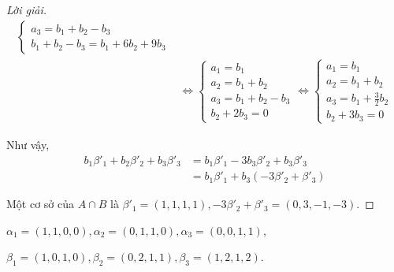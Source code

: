 \documentclass[class=linear-algebra,crop=false]{standalone}
\begin{document}
\begin{proof}[Lời giải]
\begin{align*}
\begin{cases}
            a_{3} = b_{1} + b_{2} - b_{3} \\
            b_{1} + b_{2} - b_{3} = b_{1} + 6b_{2} + 9b_{3}
        \end{cases}       \\
         & \Longleftrightarrow\begin{cases}
                                  a_{1} = b_{1}                 \\
                                  a_{2} = b_{1} + b_{2}         \\
                                  a_{3} = b_{1} + b_{2} - b_{3} \\
                                  b_{2} + 2b_{3} = 0
                              \end{cases}
        \Longleftrightarrow
        \begin{cases}
            a_{1} = b_{1}                    \\
            a_{2} = b_{1} + b_{2}            \\
            a_{3} = b_{1} + \frac{3}{2}b_{2} \\
            b_{2} + 3b_{3} = 0
        \end{cases}
    \end{align*}
    \par Như vậy,
    \begin{align*}
        b_{1}\beta'_{1} + b_{2}\beta'_{2} + b_{3}\beta'_{3}
         & = b_{1}\beta'_{1} - 3b_{3}\beta'_{2} + b_{3}\beta'_{3} \\
         & = b_{1}\beta'_{1} + b_{3}(-3\beta'_{2} + \beta'_{3})
    \end{align*}
    \par Một cơ sở của $A\cap B$ là $\beta'_{1} = (1,1,1,1), -3\beta'_{2} + \beta'_{3} = (0, 3, -1, -3)$.
\end{proof}

\begin{exercise}$\alpha_{1} = (1,1,0,0), \alpha_{2} = (0,1,1,0), \alpha_{3} = (0,0,1,1)$,
    \par $\beta_{1} = (1,0,1,0), \beta_{2} = (0,2,1,1), \beta_{3} = (1,2,1,2)$.
\end{exercise}
\end{document}
